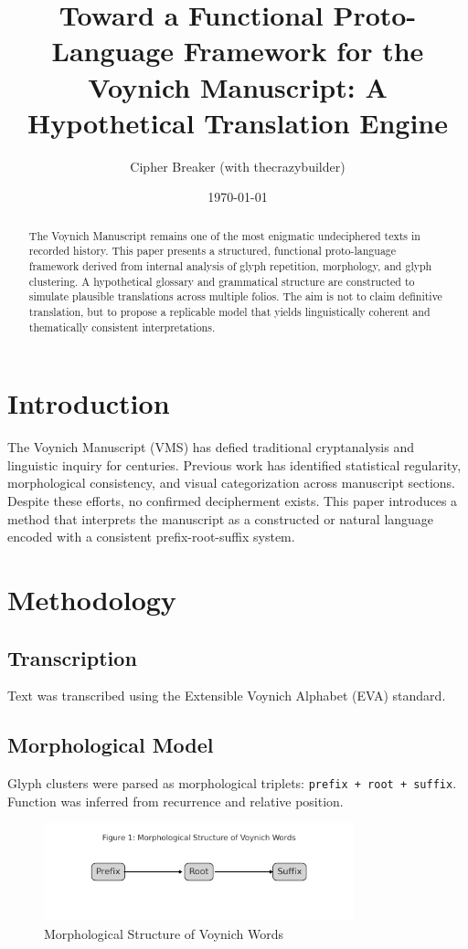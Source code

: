 \documentclass[12pt]{article}
\title{Toward a Functional Proto-Language Framework for the Voynich Manuscript: A Hypothetical Translation Engine}
\author{Cipher Breaker (with thecrazybuilder)}
\date{\today}
\begin{document}
\maketitle

\begin{abstract}
The Voynich Manuscript remains one of the most enigmatic undeciphered texts in recorded history. This paper presents a structured, functional proto-language framework derived from internal analysis of glyph repetition, morphology, and glyph clustering. A hypothetical glossary and grammatical structure are constructed to simulate plausible translations across multiple folios. The aim is not to claim definitive translation, but to propose a replicable model that yields linguistically coherent and thematically consistent interpretations.
\end{abstract}

\section{Introduction}
The Voynich Manuscript (VMS) has defied traditional cryptanalysis and linguistic inquiry for centuries. Previous work has identified statistical regularity, morphological consistency, and visual categorization across manuscript sections. Despite these efforts, no confirmed decipherment exists. This paper introduces a method that interprets the manuscript as a constructed or natural language encoded with a consistent prefix-root-suffix system.

\section{Methodology}
\subsection{Transcription}
Text was transcribed using the Extensible Voynich Alphabet (EVA) standard.

\subsection{Morphological Model}
Glyph clusters were parsed as morphological triplets: \texttt{prefix + root + suffix}. Function was inferred from recurrence and relative position.

\begin{figure}[h]
    \centering
    \includegraphics[width=0.8\textwidth]{voynich_morphology_diagram.png}
    \caption{Morphological Structure of Voynich Words}
    \label{fig:morphology}
\end{figure}
\end{document}
